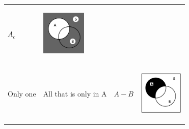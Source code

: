 \begin{center}
\begin{xtabular*}{\mytablewidth}[t]{|p{10\mystarwidth}|p{10\mystarwidth}|p{10\mystarwidth}|p{10\mystarwidth}|}
        ${A}_{c}$ &
    \setcounter{subfigure}{0}
\label{m39373*uid14567}
    \begin{center}
    \label{m39373*uid14567!!!underscore!!!media}\label{m39373*uid14567!!!underscore!!!printimage}\includegraphics[width=80px]{col11306.imgs/m39373_complement.png} %
      \vspace{2pt}
    \vspace{.1in}
    \end{center}    %
     \tabularnewline{}
        Only one &
        All that is only in A &
        $A-B$ &
    \setcounter{subfigure}{0}
\label{m39373*uid14767}
    \begin{center}
    \label{m39373*uid14767!!!underscore!!!media}\label{m39373*uid14767!!!underscore!!!printimage}\includegraphics[width=80px]{col11306.imgs/m39373_a-b.png} %
      \vspace{2pt}
    \vspace{.1in}
    \end{center}    %
     \tabularnewline{}
    \end{xtabular*}
      \end{center}
